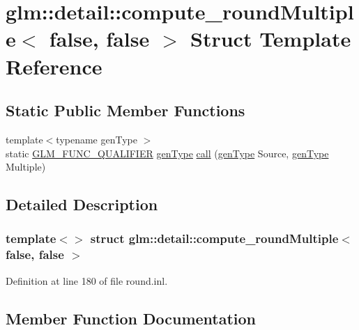 \hypertarget{structglm_1_1detail_1_1compute__round_multiple_3_01false_00_01false_01_4}{}\section{glm\+::detail\+::compute\+\_\+round\+Multiple$<$ false, false $>$ Struct Template Reference}
\label{structglm_1_1detail_1_1compute__round_multiple_3_01false_00_01false_01_4}
\subsection*{Static Public Member Functions}
\begin{DoxyCompactItemize}
\item 
{\footnotesize template$<$typename gen\+Type $>$ }\\static \mbox{\hyperlink{setup_8hpp_a33fdea6f91c5f834105f7415e2a64407}{G\+L\+M\+\_\+\+F\+U\+N\+C\+\_\+\+Q\+U\+A\+L\+I\+F\+I\+ER}} \mbox{\hyperlink{structglm_1_1detail_1_1gen_type}{gen\+Type}} \mbox{\hyperlink{structglm_1_1detail_1_1compute__round_multiple_3_01false_00_01false_01_4_a9242ffccd610779b8020ad382d47213a}{call}} (\mbox{\hyperlink{structglm_1_1detail_1_1gen_type}{gen\+Type}} Source, \mbox{\hyperlink{structglm_1_1detail_1_1gen_type}{gen\+Type}} Multiple)
\end{DoxyCompactItemize}


\subsection{Detailed Description}
\subsubsection*{template$<$$>$\newline
struct glm\+::detail\+::compute\+\_\+round\+Multiple$<$ false, false $>$}



Definition at line 180 of file round.\+inl.



\subsection{Member Function Documentation}
\mbox{\label{structglm_1_1detail_1_1compute__round_multiple_3_01false_00_01false_01_4_a9242ffccd610779b8020ad382d47213a}} 
